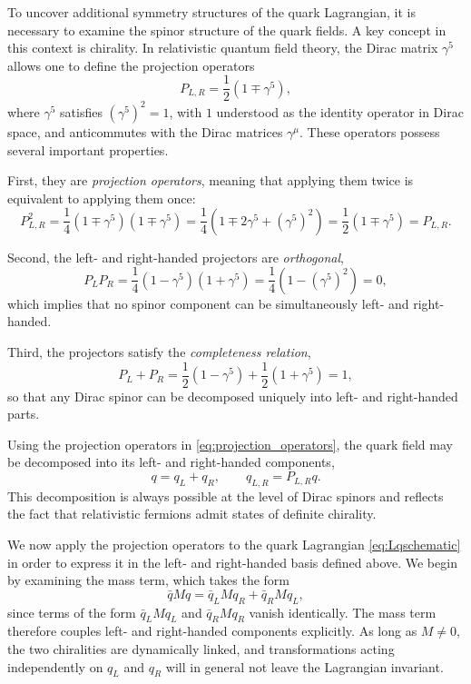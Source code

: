 To uncover additional symmetry structures of the quark Lagrangian,
it is necessary to examine the spinor structure of the quark fields.
A key concept in this context is chirality. In relativistic quantum
field theory, the Dirac matrix $\gamma^5$ allows one to define the
projection operators
\begin{equation}
P_{L,R} = \frac{1}{2}(1 \mp \gamma^5),
\label{eq:projection_operators}
\end{equation}
where $\gamma^5$ satisfies $(\gamma^5)^2 = 1$, with $1$ understood as
the identity operator in Dirac space, and anticommutes with the Dirac
matrices $\gamma^\mu$. These operators possess several important
properties.

First, they are \emph{projection operators}, meaning that applying
them twice is equivalent to applying them once:
\begin{equation}
P_{L,R}^2
= \frac{1}{4}(1 \mp \gamma^5)(1 \mp \gamma^5)
= \frac{1}{4}(1 \mp 2\gamma^5 + (\gamma^5)^2)
= \frac{1}{2}(1 \mp \gamma^5)
= P_{L,R}.
\end{equation}

Second, the left- and right-handed projectors are \emph{orthogonal},
\begin{equation}
P_L P_R
= \frac{1}{4}(1 - \gamma^5)(1 + \gamma^5)
= \frac{1}{4}(1 - (\gamma^5)^2)
= 0,
\end{equation}
which implies that no spinor component can be simultaneously left-
and right-handed.

Third, the projectors satisfy the \emph{completeness relation},
\begin{equation}
P_L + P_R
= \frac{1}{2}(1 - \gamma^5) + \frac{1}{2}(1 + \gamma^5)
= 1,
\end{equation}
so that any Dirac spinor can be decomposed uniquely into left- and
right-handed parts.

Using the projection operators in \eqref{eq:projection_operators},
the quark field may be decomposed into its left- and right-handed
components,
\begin{equation}
q = q_L + q_R, \qquad
q_{L,R} = P_{L,R} q .
\end{equation}
This decomposition is always possible at the level of Dirac spinors
and reflects the fact that relativistic fermions admit states of
definite chirality.

We now apply the projection operators to the quark Lagrangian
\eqref{eq:Lqschematic} in order to express it in the left- and
right-handed basis defined above. We begin by examining the mass
term, which takes the form
\begin{equation}
\bar q M q
= \bar q_L M q_R + \bar q_R M q_L ,
\label{eq:qm_decomp}
\end{equation}
since terms of the form $\bar q_L M q_L$ and $\bar q_R M q_R$
vanish identically. The mass term therefore couples left- and
right-handed components explicitly. As long as $M \neq 0$, the two
chiralities are dynamically linked, and transformations acting
independently on $q_L$ and $q_R$ will in general not leave the
Lagrangian invariant.

